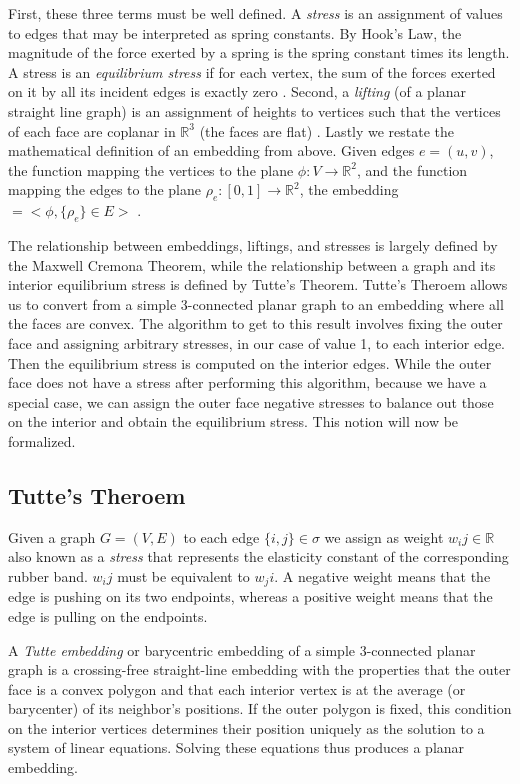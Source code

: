 \documentclass[11pt]{article}
\newcommand{\R}{\mathbb{R}}
\begin{document}
First, these three terms must be well defined. A \emph{stress} is an assignment of values to edges that may be interpreted as spring constants. By Hook's Law, the magnitude of the force exerted by a spring is the spring constant times its length. A stress is an \emph{equilibrium stress} if for each vertex, the sum of the forces exerted on it by all its incident edges is exactly zero \cite{AresRiboMor}.
Second, a \emph{lifting} (of a planar straight line graph) is an assignment of heights to vertices such that the vertices of each face are coplanar in $\R^3$ (the faces are flat) \cite{WhiteleyHandbook}. Lastly we restate the mathematical definition of an embedding from above. Given edges $e=(u,v)$, the function mapping the vertices to the plane $ \phi :V \rightarrow \R^2$, and the function mapping the edges to the plane $ \rho_e :[0,1] \rightarrow \R^2$, the embedding $= <\phi, \{\rho_e\} \in E >$ \cite{mathworld:Embedding}.

  The relationship between embeddings, liftings, and stresses is largely defined by the Maxwell Cremona Theorem, while the relationship between a graph and its interior equilibrium stress is defined by Tutte's Theorem.  Tutte's Theroem allows us to convert from a simple 3-connected planar graph to an embedding where all the faces are convex. The algorithm to get to this result involves fixing the outer face and assigning arbitrary stresses, in our case of value 1, to each interior edge. Then the equilibrium stress is computed on the interior edges. While the outer face does not have a stress after performing this algorithm, because we have a special case, we can assign the outer face negative stresses to balance out those on the interior and obtain the equilibrium stress. This notion will now be formalized.

\subsection{Tutte's Theroem}
 Given a graph $G=(V,E)$ to each edge $\{i,j\}\in\sigma$ we assign as weight $w_ij\in\R$ also known as a \emph{stress} that represents the elasticity constant of the corresponding rubber band. $w_ij$ must be equivalent to $w_ji$. A negative weight means that the edge is pushing on its two endpoints, whereas a positive weight means that the edge is pulling on the endpoints. 
  
  A \emph{Tutte embedding} or barycentric embedding of a simple 3-connected planar graph is a crossing-free straight-line embedding with the properties that the outer face is a convex polygon and that each interior vertex is at the average (or barycenter) of its neighbor's positions. If the outer polygon is fixed, this condition on the interior vertices determines their position uniquely as the solution to a system of linear equations. Solving these equations thus produces a planar embedding. 
  
\end{document}
